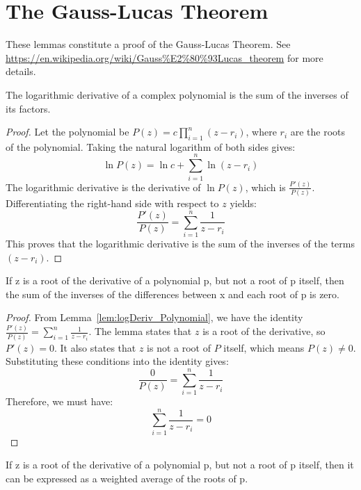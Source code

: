 

\chapter{The Gauss-Lucas Theorem}

These lemmas constitute a proof of the Gauss-Lucas Theorem. See \url{https://en.wikipedia.org/wiki/Gauss%E2%80%93Lucas_theorem} for more details.

\begin{lemma}
  \label{lem:logDeriv_Polynomial}
  \leanok
  The logarithmic derivative of a complex polynomial
  is the sum of the inverses of its factors.
\end{lemma}

\begin{proof}
Let the polynomial be $P(z) = c \prod_{i=1}^{n} (z - r_i)$, where $r_i$ are the roots of the polynomial.
Taking the natural logarithm of both sides gives:
$$ \ln P(z) = \ln c + \sum_{i=1}^{n} \ln(z - r_i) $$
The logarithmic derivative is the derivative of $\ln P(z)$, which is $\frac{P'(z)}{P(z)}$. Differentiating the right-hand side with respect to $z$ yields:
$$ \frac{P'(z)}{P(z)} = \sum_{i=1}^{n} \frac{1}{z - r_i} $$
This proves that the logarithmic derivative is the sum of the inverses of the terms $(z - r_i)$.
\end{proof}

\begin{lemma}
  \label{lem:sum_inv_sub_roots_eq_zero}
  \leanok
  If z is a root of the derivative of a polynomial p, but not a root of p itself, then the sum of the inverses of the differences between x and each root of p is zero.
\end{lemma}

\begin{proof}
  From Lemma~\ref{lem:logDeriv_Polynomial}, we have the identity $\frac{P'(z)}{P(z)} = \sum_{i=1}^{n} \frac{1}{z - r_i}$.
  The lemma states that $z$ is a root of the derivative, so $P'(z) = 0$. It also states that $z$ is not a root of $P$ itself, which means $P(z) \neq 0$.
  Substituting these conditions into the identity gives:
  $$ \frac{0}{P(z)} = \sum_{i=1}^{n} \frac{1}{z - r_i} $$
  Therefore, we must have:
  $$ \sum_{i=1}^{n} \frac{1}{z - r_i} = 0 $$
\end{proof}

\begin{lemma}
  \label{lem:deriv_root_as_weighted_average_of_roots}
  \leanok
  If z is a root of the derivative of a polynomial p, but not a root of p itself,
  then it can be expressed as a weighted average of the roots of p.
\end{lemma}

